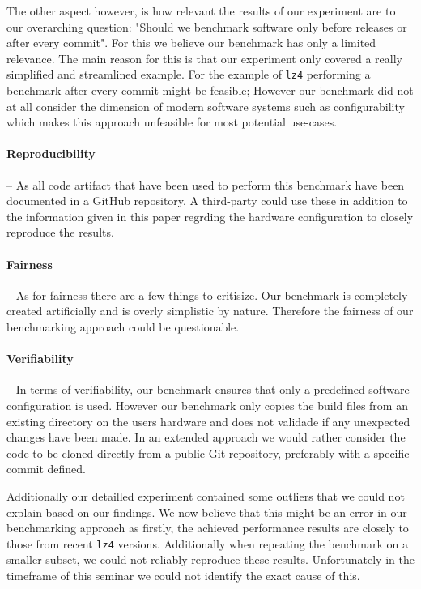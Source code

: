 \documentclass[	runningheads,
				a4paper]{llncs}
\begin{document}
	The other aspect however, is how relevant the results of our experiment are to our overarching question: "Should we benchmark software only before releases or after every commit". For this we believe our benchmark has only a limited relevance. The main reason for this is that our experiment only covered a really simplified and streamlined example. For the example of \texttt{lz4} performing a benchmark after every commit might be feasible; However our benchmark did not at all consider the dimension of modern software systems such as configurability which makes this approach unfeasible for most potential use-cases.

\paragraph{Reproducibility} -- As all code artifact that have been used to perform this benchmark have been documented in a GitHub repository. A third-party could use these in addition to the information given in this paper regrding the hardware configuration to closely reproduce the results.

\paragraph{Fairness} -- As for fairness there are a few things to critisize. Our benchmark is completely created artificially and is overly simplistic by nature. Therefore the fairness of our benchmarking approach could be questionable.

\paragraph{Verifiability} -- In terms of verifiability, our benchmark ensures that only a predefined software configuration is used. However our benchmark only copies the build files from an existing directory on the users hardware and does not validade if any unexpected changes have been made. In an extended approach we would rather consider the code to be cloned directly from a public Git repository, preferably with a specific commit defined.

Additionally our detailled experiment contained some outliers that we could not explain based on our findings. We now believe that this might be an error in our benchmarking approach as firstly, the achieved performance results are closely to those from recent \texttt{lz4} versions. Additionally when repeating the benchmark on a smaller subset, we could not reliably reproduce these results. Unfortunately in the timeframe of this seminar we could not identify the exact cause of this.
\end{document}
